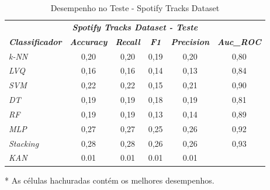 \documentclass[journal]{IEEEtran}
\begin{document}
\begin{table}[h!]
	\caption{Desempenho no Teste - Spotify Tracks Dataset}
	\label{tab:22}
	\begin{threeparttable}
		\begin{tabular}{lccccc}
			\hline
			\multicolumn{6}{c}{\textit{\textbf{Spotify Tracks Dataset - Teste}}}                                                                                                                                 \\
			\multicolumn{1}{l|}{\textit{\textbf{Classificador}}} & \textit{\textbf{Accuracy}} & \textit{\textbf{Recall}}  & \textit{\textbf{F1}}      & \textit{\textbf{Precision}} & \textit{\textbf{Auc\_ROC}} \\ \hline
			\multicolumn{1}{l|}{\textit{k-NN}}                   & 0,20                       & 0,20                      & 0,19                      & 0,20                        & 0,80                       \\
			\multicolumn{1}{l|}{\textit{LVQ}}                    & 0,16                       & 0,16                      & 0,14                      & 0,13                        & 0,84                       \\
			\multicolumn{1}{l|}{\textit{SVM}}                    & 0,22                       & 0,22                      & 0,15                      & 0,21                        & 0,90                       \\
			\multicolumn{1}{l|}{\textit{DT}}                     & 0,19                       & 0,19                      & 0,18                      & 0,19                        & 0,81                       \\
			\multicolumn{1}{l|}{\textit{RF}}                     & 0,19                       & 0,19                      & 0,13                      & 0,14                        & 0,89                       \\
			\multicolumn{1}{l|}{\textit{MLP}}                    & 0,27                       & 0,27                      & 0,25                      & \cellcolor{lightgray}0,26   & 0,92                       \\
			\multicolumn{1}{l|}{\textit{Stacking}}               & \cellcolor{lightgray}0,28  & \cellcolor{lightgray}0,28 & \cellcolor{lightgray}0,26 & \cellcolor{lightgray}0,26   & \cellcolor{lightgray}0,93  \\
			\multicolumn{1}{l|}{\textit{KAN}}                    & 0.01                       & 0.01                      & 0.01                      & 0.01                        &                            \\
			\hline
		\end{tabular}
		\begin{tablenotes}\footnotesize
			\item[*] As células hachuradas contém os melhores desempenhos.
		\end{tablenotes}
	\end{threeparttable}
\end{table}
\end{document}
